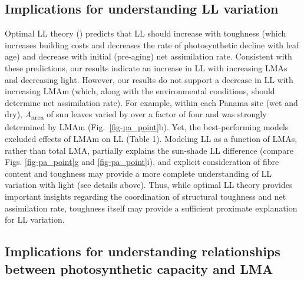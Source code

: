 \documentclass[
  12pt,
  letterpaper,
  DIV=11,
  numbers=noendperiod]{scrartcl}
\begin{document}
\subsection{Implications for understanding LL
variation}\label{implications-for-understanding-ll-variation}

Optimal LL theory () predicts
that LL should increase with toughness (which increases building costs
and decreases the rate of photosynthetic decline with leaf age) and
decrease with initial (pre-aging) net assimilation rate. Consistent with
these predictions, our results indicate an increase in LL with
increasing LMAs and decreasing light. However, our results do not
support a decrease in LL with increasing LMAm (which, along with the
environmental conditions, should determine net assimilation rate). For
example, within each Panama site (wet and dry),
\emph{A}\textsubscript{area} of sun leaves varied by over a factor of
four and was strongly determined by LMAm (Fig.~\ref{fig-pa_point}b).
Yet, the best-performing models excluded effects of LMAm on LL (Table
1). Modeling LL as a function of LMAs, rather than total LMA, partially
explains the sun-shade LL difference (compare Figs. \ref{fig-pa_point}g
and \ref{fig-pa_point}i), and explicit consideration of fibre content
and toughness may provide a more complete understanding of LL variation
with light (see details above). Thus, while optimal LL theory provides
important insights regarding the coordination of structural toughness
and net assimilation rate, toughness itself may provide a sufficient
proximate explanation for LL variation.

\subsection{Implications for understanding relationships between
photosynthetic capacity and
LMA}\label{implications-for-understanding-relationships-between-photosynthetic-capacity-and-lma}
\end{document}
